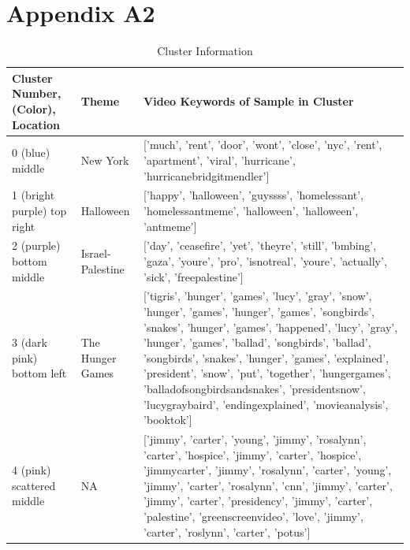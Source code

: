 \documentclass{article}
\begin{document}
\section*{Appendix A2}

\begin{table}[h!]
    \centering
    \caption{Cluster Information}
    \begin{tabular}{|p{4cm}|p{2cm}|p{8cm}|}
        \hline
        \textbf{Cluster Number, (Color), Location} & \textbf{Theme} & \textbf{Video Keywords of Sample in Cluster} \\
        \hline
        0 (blue) middle & New York & ['much', 'rent', 'door', 'wont', 'close', 'nyc', 'rent', 'apartment', 'viral', 'hurricane', 'hurricanebridgitmendler'] \\ 

        \hline

        1 (bright purple) top right & Halloween & ['happy', 'halloween', 'guyssss', 'homelessant', 'homelessantmeme', 'halloween', 'halloween', 'antmeme'] \\

        \hline
        2 (purple) bottom middle & Israel-Palestine & ['day', 'ceasefire', 'yet', 'theyre', 'still', 'bmbing', 'gaza', 'youre', 'pro', 'isnotreal', 'youre', 'actually', 'sick', 'freepalestine'] \\ 
        \hline

        3 (dark pink) bottom left & The Hunger Games & ['tigris', 'hunger', 
        'games', 'lucy', 'gray', 'snow', 'hunger', 'games', 'hunger', 'games', 
        'songbirds', 'snakes', 'hunger', 'games', 'happened', 'lucy', 'gray', 
        'hunger', 'games', 'ballad', 'songbirds', 'ballad', 'songbirds', 
        'snakes', 'hunger', 'games', 'explained', 'president', 'snow', 'put', 
        'together', 'hungergames', 'balladofsongbirdsandsnakes', 'presidentsnow', 'lucygraybaird', 'endingexplained', 'movieanalysis', 'booktok'] \\ 

        \hline

        4 (pink) scattered middle & NA & ['jimmy', 'carter', 'young', 'jimmy', 
        'rosalynn', 'carter', 'hospice', 'jimmy', 'carter', 'hospice', 
        'jimmycarter', 'jimmy', 'rosalynn', 'carter', 'young', 'jimmy', 
        'carter', 'rosalynn', 'cnn', 'jimmy', 'carter', 'jimmy', 'carter', 
        'presidency', 'jimmy', 'carter', 'palestine', 'greenscreenvideo', 
        'love', 'jimmy', 'carter', 'roslynn', 'carter', 'potus'] \\ 


\end{tabular}
\end{table}
\end{document}
